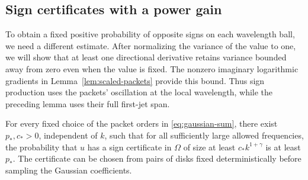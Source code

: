 \subsection{Sign certificates with a power gain}

To obtain a fixed positive probability of opposite signs on each
wavelength ball, we need a different estimate. After normalizing
the variance of the value to one, we will show that at least one
directional derivative retains variance bounded away from zero even
when the value is fixed. The nonzero imaginary logarithmic gradients
in Lemma~\ref{lem:scaled-packets} provide this bound. Thus sign
production uses the packets' oscillation at the local wavelength,
while the preceding lemma uses their full first-jet span.

\begin{lemma}\label{lem:signs}
For every fixed choice of the packet orders in
\eqref{eq:gaussian-sum}, there exist $p_*,c_*>0$, independent of
$k$, such that for all sufficiently large allowed frequencies,
the probability that $u$ has a sign certificate in $\Omega$ of size
at least $c_*k^{1+\gamma}$ is at least $p_*$. The certificate can be
chosen from pairs of disks fixed deterministically before sampling
the Gaussian coefficients.
\end{lemma}

